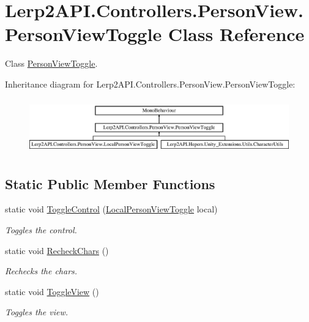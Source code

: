 \hypertarget{class_lerp2_a_p_i_1_1_controllers_1_1_person_view_1_1_person_view_toggle}{}\section{Lerp2\+A\+P\+I.\+Controllers.\+Person\+View.\+Person\+View\+Toggle Class Reference}
\label{class_lerp2_a_p_i_1_1_controllers_1_1_person_view_1_1_person_view_toggle}


Class \hyperlink{class_lerp2_a_p_i_1_1_controllers_1_1_person_view_1_1_person_view_toggle}{Person\+View\+Toggle}.  


Inheritance diagram for Lerp2\+A\+P\+I.\+Controllers.\+Person\+View.\+Person\+View\+Toggle\+:\begin{figure}[H]
\begin{center}
\leavevmode
\includegraphics[height=2.386364cm]{class_lerp2_a_p_i_1_1_controllers_1_1_person_view_1_1_person_view_toggle}
\end{center}
\end{figure}
\subsection*{Static Public Member Functions}
\begin{DoxyCompactItemize}
\item 
static void \hyperlink{class_lerp2_a_p_i_1_1_controllers_1_1_person_view_1_1_person_view_toggle_a435c0af2038125f543055728a13a87f2}{Toggle\+Control} (\hyperlink{class_lerp2_a_p_i_1_1_controllers_1_1_person_view_1_1_local_person_view_toggle}{Local\+Person\+View\+Toggle} local)
\begin{DoxyCompactList}\small\item\em Toggles the control. \end{DoxyCompactList}\item 
static void \hyperlink{class_lerp2_a_p_i_1_1_controllers_1_1_person_view_1_1_person_view_toggle_a9fbe850598e30032dc6f762197a47599}{Recheck\+Chars} ()
\begin{DoxyCompactList}\small\item\em Rechecks the chars. \end{DoxyCompactList}\item 
static void \hyperlink{class_lerp2_a_p_i_1_1_controllers_1_1_person_view_1_1_person_view_toggle_abc74b24502c357388763015fef6def0d}{Toggle\+View} ()
\begin{DoxyCompactList}\small\item\em Toggles the view. \end{DoxyCompactList}\end{DoxyCompactItemize}
